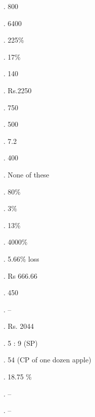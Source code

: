 \documentclass{article}
\begin{document}
	. 800
	
	\noindent 
	
	. 6400
	
	\noindent 
	
	. 225\%
	
	\noindent 
	
	. 17\%
	
	\noindent 
	
	. 140
	
	\noindent 
	
	. Rs.2250
	
	\noindent 
	
	. 750
	
	\noindent 
	
	. 500
	
	\noindent 
	
	. 7.2
	
	\noindent 
	
	. 400
	
	\noindent 
	
	. None of these
	
	\noindent 
	
	. 80\%
	
	\noindent 
	
	. 3\%
	
	\noindent 
	
	. 13\%
	
	\noindent 
	
	. 4000\%
	
	\noindent 
	
	. 5.66\% loss
	
	\noindent 
	
	. Rs 666.66
	
	\noindent 
	
	. 450
	
	\noindent 
	
	. --
	
	\noindent 
	
	. Rs. 2044
	
	\noindent 
	
	. 5 : 9 (SP)
	
	\noindent 
	
	. 54 (CP of one dozen apple)
	
	\noindent 
	
	. 18.75 \%
	
	\noindent 
	
	. --
	
	\noindent 
	
	. --
	
	\noindent 
	
	\noindent 
	
	\noindent 
\end{document}

